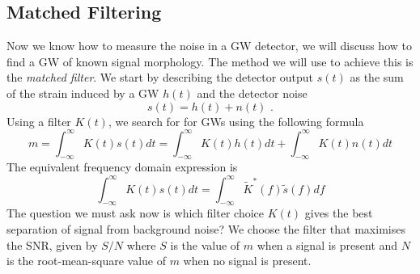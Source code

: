 \documentclass[11pt]{cuthesis}
\newcommand{\fs}{\text{ .}}
\begin{document}
\subsection{Matched Filtering}
Now we know how to measure the noise in a GW detector, we will discuss how to find a GW of known signal morphology. The method we will use to achieve this is the \textit{matched filter}. We start by describing the detector output $s(t)$ as the sum of the strain induced by a GW $h(t)$ and the detector noise
\begin{equation}
s(t) = h(t) + n(t) \fs
\end{equation}
Using a filter $K(t)$, we search for for GWs using the following formula
\begin{equation}
m = \int_{-\infty}^\infty K(t) s(t) dt = \int_{-\infty}^\infty K(t) h(t) dt + \int_{-\infty}^\infty K(t) n(t) dt
\end{equation}
The equivalent frequency domain expression is 
\begin{equation}
\int_{-\infty}^\infty K(t) s(t) dt = \int_{-\infty}^\infty \tilde{K}^*(f) \tilde{s}(f) df
\end{equation}
The question we must ask now is which filter choice $K(t)$ gives the best separation of signal from background noise? We choose the filter that maximises the SNR, given by $S/N$ where $S$ is the value of $m$ when a signal is present and $N$ is the root-mean-square value of $m$ when no signal is present.
\end{document}

